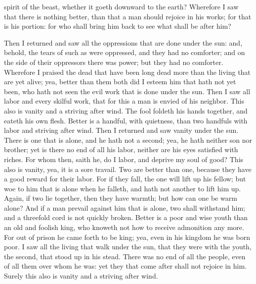 spirit of the beast, whether it goeth downward to the earth? Wherefore I saw that there is nothing better, than that a man should rejoice in his works; for that is his portion: for who shall bring him back to see what shall be after him? 

Then I returned and saw all the oppressions that are done under the sun: and, behold, the tears of such as were oppressed, and they had no comforter; and on the side of their oppressors there was power; but they had no comforter. Wherefore I praised the dead that have been long dead more than the living that are yet alive; yea, better than them both did I esteem him that hath not yet been, who hath not seen the evil work that is done under the sun.  Then I saw all labor and every skilful work, that for this a man is envied of his neighbor. This also is vanity and a striving after wind. The fool foldeth his hands together, and eateth his own flesh. Better is a handful, with quietness, than two handfuls with labor and striving after wind.  Then I returned and saw vanity under the sun. There is one that is alone, and he hath not a second; yea, he hath neither son nor brother; yet is there no end of all his labor, neither are his eyes satisfied with riches. For whom then, saith he, do I labor, and deprive my soul of good? This also is vanity, yea, it is a sore travail. Two are better than one, because they have a good reward for their labor. For if they fall, the one will lift up his fellow; but woe to him that is alone when he falleth, and hath not another to lift him up. Again, if two lie together, then they have warmth; but how can one be warm alone? And if a man prevail against him that is alone, two shall withstand him; and a threefold cord is not quickly broken.  Better is a poor and wise youth than an old and foolish king, who knoweth not how to receive admonition any more. For out of prison he came forth to be king; yea, even in his kingdom he was born poor. I saw all the living that walk under the sun, that they were with the youth, the second, that stood up in his stead. There was no end of all the people, even of all them over whom he was: yet they that come after shall not rejoice in him. Surely this also is vanity and a striving after wind. 


